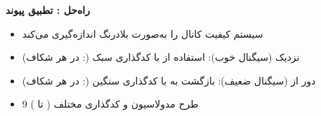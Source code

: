\textbf{راه‌حل : تطبیق پیوند}

\begin{itemize}
\tightlist
\item
  سیستم کیفیت کانال را به‌صورت بلادرنگ اندازه‌گیری می‌کند
\item
  نزدیک  (سیگنال خوب): استفاده از  با کدگذاری سبک (:  در هر شکاف)
\item
  دور از  (سیگنال ضعیف): بازگشت به  با کدگذاری سنگین (:  در هر شکاف)
\item
  9 طرح مدولاسیون و کدگذاری مختلف ( تا )
\end{itemize}



